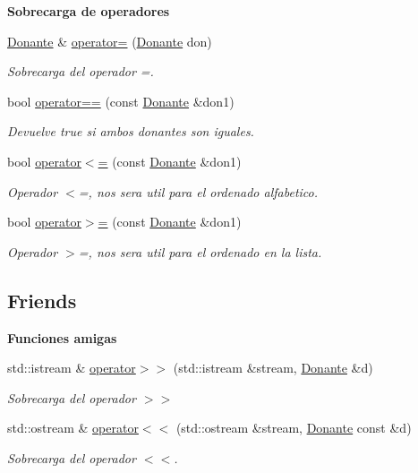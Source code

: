 \begin{Indent}{\bf Sobrecarga de operadores}\par
\begin{DoxyCompactItemize}
\item 
\hyperlink{classed_1_1Donante}{Donante} \& \hyperlink{classed_1_1Donante_ac517a0b7d0110ded5730241ca1357c1b}{operator=} (\hyperlink{classed_1_1Donante}{Donante} don)
\begin{DoxyCompactList}\small\item\em Sobrecarga del operador =. \end{DoxyCompactList}\item 
bool \hyperlink{classed_1_1Donante_a4335aaf566fe258aa97dbe83becc45a0}{operator==} (const \hyperlink{classed_1_1Donante}{Donante} \&don1)
\begin{DoxyCompactList}\small\item\em Devuelve true si ambos donantes son iguales. \end{DoxyCompactList}\item 
bool \hyperlink{classed_1_1Donante_aa6c68c52b4e36454fae3fc252904fb7a}{operator$<$=} (const \hyperlink{classed_1_1Donante}{Donante} \&don1)
\begin{DoxyCompactList}\small\item\em Operador $<$=, nos sera util para el ordenado alfabetico. \end{DoxyCompactList}\item 
bool \hyperlink{classed_1_1Donante_a55423d33ae333c344b079eadf71d1cbe}{operator$>$=} (const \hyperlink{classed_1_1Donante}{Donante} \&don1)
\begin{DoxyCompactList}\small\item\em Operador $>$=, nos sera util para el ordenado en la lista. \end{DoxyCompactList}\end{DoxyCompactItemize}
\end{Indent}
\subsection*{Friends}
\begin{Indent}{\bf Funciones amigas}\par
\begin{DoxyCompactItemize}
\item 
std\+::istream \& \hyperlink{classed_1_1Donante_acbd1fb64ad57f44d7c558c5035f5792a}{operator$>$$>$} (std\+::istream \&stream, \hyperlink{classed_1_1Donante}{Donante} \&d)
\begin{DoxyCompactList}\small\item\em Sobrecarga del operador $>$$>$ \end{DoxyCompactList}\item 
std\+::ostream \& \hyperlink{classed_1_1Donante_ab52eb93adf74c23cd988ea8868a08fa0}{operator$<$$<$} (std\+::ostream \&stream, \hyperlink{classed_1_1Donante}{Donante} const \&d)
\begin{DoxyCompactList}\small\item\em Sobrecarga del operador $<$$<$. \end{DoxyCompactList}\end{DoxyCompactItemize}
\end{Indent}


